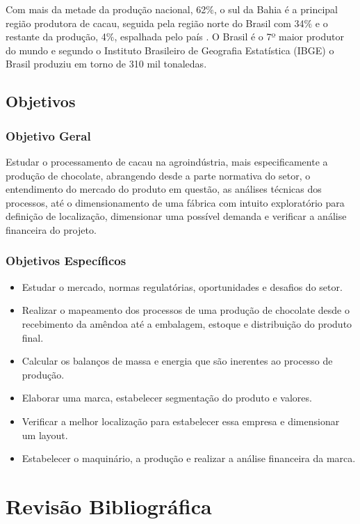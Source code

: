 \documentclass[
	12pt,				%
	openright,			%
	oneside,			%
	a4paper,			%
	english,			%
	french,				%
	spanish,			%
	brazil				%
	]{abntex2}
\begin{document}
Com mais da metade da produção nacional, 62$\%$, o sul da Bahia é a principal região produtora de cacau, seguida pela região norte do Brasil com 34$\%$ e o restante da produção, 4$\%$, espalhada pelo país \cite{1}. O Brasil é o 7º maior produtor do mundo e segundo o Instituto Brasileiro de Geografia Estatística (IBGE) o Brasil produziu em torno de 310 mil tonaledas. \cite{3} 


\section{Objetivos}

\subsection{Objetivo Geral}

Estudar o processamento de cacau na agroindústria, mais especificamente a produção de chocolate, abrangendo desde a parte normativa do setor, o entendimento do mercado do produto em questão, as análises técnicas dos processos, até o dimensionamento de uma fábrica com intuito exploratório para definição de localização, dimensionar uma possível demanda e verificar a análise financeira do projeto.

\subsection{Objetivos Específicos}

\begin{itemize}
\item Estudar o mercado, normas regulatórias, oportunidades e desafios do setor.
\item Realizar o mapeamento dos processos de uma produção de chocolate desde o recebimento da amêndoa até a embalagem, estoque e distribuição do produto final.
\item Calcular os balanços de massa e energia que são inerentes ao processo de produção.
\item Elaborar uma marca, estabelecer segmentação do produto e valores.
\item Verificar a melhor localização para estabelecer essa empresa e dimensionar um layout.
\item Estabelecer o maquinário, a produção e realizar a análise financeira da marca.
\end{itemize}

\newpage
\chapter{Revisão Bibliográfica}
\end{document}
